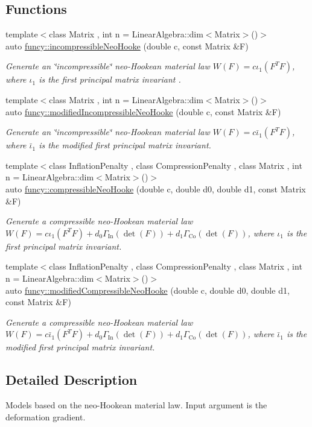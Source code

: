 \subsection*{Functions}
\begin{DoxyCompactItemize}
\item 
{\footnotesize template$<$class Matrix , int n = Linear\-Algebra\-::dim$<$\-Matrix$>$()$>$ }\\auto \hyperlink{group__Rubber_gad0d93d6dfb3693483fcd37144959de24}{funcy\-::incompressible\-Neo\-Hooke} (double c, const Matrix \&F)
\begin{DoxyCompactList}\small\item\em Generate an \char`\"{}incompressible\char`\"{} neo-\/\-Hookean material law $ W(F)=c\iota_1(F^T F) $, where $\iota_1$ is the first principal matrix invariant . \end{DoxyCompactList}\item 
{\footnotesize template$<$class Matrix , int n = Linear\-Algebra\-::dim$<$\-Matrix$>$()$>$ }\\auto \hyperlink{group__Rubber_gae9f87c6f1fd4edddd0894edefd9fb9a5}{funcy\-::modified\-Incompressible\-Neo\-Hooke} (double c, const Matrix \&F)
\begin{DoxyCompactList}\small\item\em Generate an \char`\"{}incompressible\char`\"{} neo-\/\-Hookean material law $ W(F)=c\bar\iota_1(F^T F) $, where $\bar\iota_1$ is the modified first principal matrix invariant. \end{DoxyCompactList}\item 
{\footnotesize template$<$class Inflation\-Penalty , class Compression\-Penalty , class Matrix , int n = Linear\-Algebra\-::dim$<$\-Matrix$>$()$>$ }\\auto \hyperlink{group__Rubber_ga03b9323b57ee11b09ed0515d6ea5b01b}{funcy\-::compressible\-Neo\-Hooke} (double c, double d0, double d1, const Matrix \&F)
\begin{DoxyCompactList}\small\item\em Generate a compressible neo-\/\-Hookean material law $ W(F)=c\iota_1(F^T F)+d_0\Gamma_\mathrm{In}(\det(F))+d_1\Gamma_\mathrm{Co}(\det(F)) $, where $\iota_1$ is the first principal matrix invariant. \end{DoxyCompactList}\item 
{\footnotesize template$<$class Inflation\-Penalty , class Compression\-Penalty , class Matrix , int n = Linear\-Algebra\-::dim$<$\-Matrix$>$()$>$ }\\auto \hyperlink{group__Rubber_ga77093789a2488adcffd7d3f97b8a75e4}{funcy\-::modified\-Compressible\-Neo\-Hooke} (double c, double d0, double d1, const Matrix \&F)
\begin{DoxyCompactList}\small\item\em Generate a compressible neo-\/\-Hookean material law $ W(F)=c\bar\iota_1(F^T F)+d_0\Gamma_\mathrm{In}(\det(F))+d_1\Gamma_\mathrm{Co}(\det(F)) $, where $\bar\iota_1$ is the modified first principal matrix invariant. \end{DoxyCompactList}\end{DoxyCompactItemize}


\subsection{Detailed Description}
Models based on the neo-\/\-Hookean material law. Input argument is the deformation gradient. 